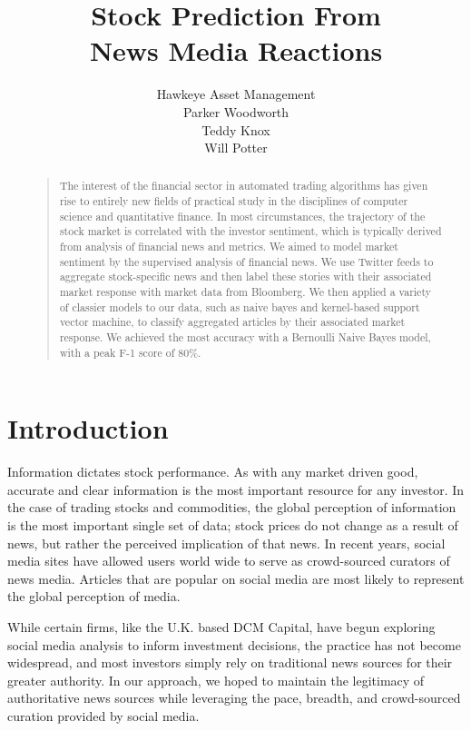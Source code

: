 \documentclass[letterpaper]{article}
\begin{document}
\title{Stock Prediction From\\ News Media Reactions}
\author{Hawkeye Asset Management\\
Parker Woodworth\\
Teddy Knox\\
Will Potter\\
}
\maketitle
\begin{abstract}
\begin{quote}
The interest of the financial sector in automated trading algorithms has given rise to entirely new fields of practical study in the disciplines of computer science and quantitative finance. In most circumstances, the trajectory of the stock market is correlated with the investor sentiment, which is typically derived from analysis of financial news and metrics. We aimed to model market sentiment by the supervised analysis of financial news. We use Twitter feeds to aggregate stock-specific news and then label these stories with their associated market response with market data from Bloomberg. We then applied a variety of classier models to our data, such as naive bayes and kernel-based support vector machine, to classify aggregated articles by their associated market response. We achieved the most accuracy with a Bernoulli Naive Bayes model, with a peak F-1 score of 80\%.
\end{quote}
\end{abstract}

\section{Introduction}
\noindent Information dictates stock performance. As with any market driven good, accurate and clear information is the most important resource for any investor. In the case of trading stocks and commodities, the global perception of information is the most important single set of data; stock prices do not change as a result of news, but rather the perceived implication of that news. In recent years, social media sites have allowed users world wide to serve as crowd-sourced curators of news media. Articles that are popular on social media are most likely to represent the global perception of media.

While certain firms, like the U.K. based DCM Capital, have begun exploring social media analysis to inform investment decisions, the practice has not become widespread, and most investors simply rely on traditional news sources for their greater authority. In our approach, we hoped to maintain the legitimacy of authoritative news sources while leveraging the pace, breadth, and crowd-sourced curation provided by social media.
\end{document}
